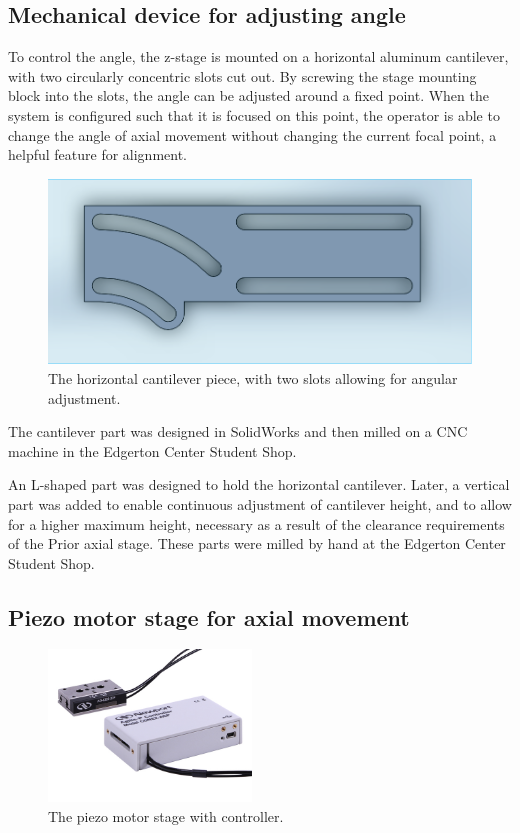 \subsection{Mechanical device for adjusting angle}

To control the angle, the z-stage is mounted on a horizontal aluminum cantilever, with two circularly concentric slots cut out. By screwing the stage mounting block into the slots, the angle can be adjusted around a fixed point. When the system is configured such that it is focused on this point, the operator is able to change the angle of axial movement without changing the current focal point, a helpful feature for alignment.

\begin{figure}[h!]
\centering
\includegraphics[width=1.0\textwidth]{Images/Alignment/horizontal_part.png}
\caption{The horizontal cantilever piece, with two slots allowing for angular adjustment.}
\end{figure}

The cantilever part was designed in SolidWorks and then milled on a CNC machine in the Edgerton Center Student Shop.

An L-shaped part was designed to hold the horizontal cantilever. Later, a vertical part was added to enable continuous adjustment of cantilever height, and to allow for a higher maximum height, necessary as a result of the clearance requirements of the Prior axial stage. These parts were milled by hand at the Edgerton Center Student Shop.

\subsection{Piezo motor stage for axial movement}

\begin{figure}[h!]
\centering
\includegraphics[width=0.48\textwidth]{Images/System/z-stage.jpg}
\caption{The piezo motor stage with controller.}
\end{figure}


